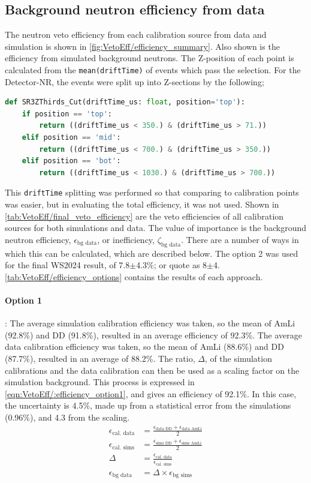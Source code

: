 \subsection{Background neutron efficiency from data}\label{sec:VetoEff/BkgNeutronEff}
The neutron veto efficiency from each calibration source from data and simulation is shown in \autoref{fig:VetoEff/efficiency_summary}.
Also shown is the efficiency from simulated background neutrons.
The Z-position of each point is calculated from the \lstinline{mean(driftTime)} of events which pass the selection.
For the Detector-NR, the events were split up into Z-sections by the following;
\begin{lstlisting}[backgroundcolor = \color{lightgray},language = Python]
def SR3ZThirds_Cut(driftTime_us: float, position='top'):
    if position == 'top':
        return ((driftTime_us < 350.) & (driftTime_us > 71.))
    elif position == 'mid':
        return ((driftTime_us < 700.) & (driftTime_us > 350.))
    elif position == 'bot':
        return ((driftTime_us < 1030.) & (driftTime_us > 700.))
\end{lstlisting}
This \lstinline{driftTime} splitting was performed so that comparing to calibration points was easier, but in evaluating the total efficiency, it was not used.
Shown in \autoref{tab:VetoEff/final_veto_efficiency} are the veto efficiencies of all calibration sources for both simulations and data.
The value of importance is the background neutron efficiency, $\epsilon_{\textrm{bg data}}$, or inefficiency, $\zeta_{\textrm{bg data}}$.
There are a number of ways in which this can be calculated, which are described below.
The option 2 was used for the final WS2024 result, of 7.8$\pm$4.3\%; or quote as 8$\pm$4.
\autoref{tab:VetoEff/efficiency_options} contains the results of each approach.
\paragraph{Option 1}:
The average simulation calibration efficiency was taken, so the mean of AmLi (92.8\%) and DD (91.8\%), resulted in an average efficiency of 92.3\%.
The average data calibration efficiency was taken, so the mean of AmLi (88.6\%) and DD (87.7\%), resulted in an average of 88.2\%.
The ratio, $\Delta$, of the simulation calibrations and the data calibration can then be used as a scaling factor on the simulation background.
This process is expressed in \autoref{eqn:VetoEff/:efficiency_option1}, and gives an efficiency of 92.1\%.
In this case, the uncertainty is 4.5\%, made up from a statistical error from the simulations (0.96\%), and 4.3 from the scaling.
\begin{align}
	\epsilon_{\textrm{cal. data}} & = \frac{\epsilon_{\textrm{data DD}} + \epsilon_{\textrm{data AmLi}}}{2} \\
	\epsilon_{\textrm{cal. sims}} & = \frac{\epsilon_{\textrm{sims DD}} + \epsilon_{\textrm{sims AmLi}}}{2} \\
	\Delta                        & = \frac{\epsilon_{\textrm{cal. data}}}{\epsilon_{\textrm{cal. sims}}}   \\
	\epsilon_{\textrm{bg data}}   & = \Delta \times \epsilon_{\textrm{bg sims}}
	\label{eqn:VetoEff/:efficiency_option1}
\end{align}

